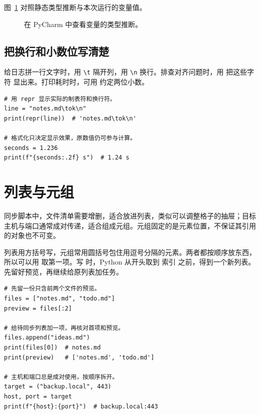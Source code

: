 图~\ref{fig:pycharm-type-inference} 对照静态类型推断与本次运行的变量值。
\begin{figure}[htbp]
  \centering
  
  \caption{在 PyCharm 中查看变量的类型推断。}
  \label{fig:pycharm-type-inference}
\end{figure}

\subsection*{把换行和小数位写清楚}

给日志拼一行文字时，用 \texttt{\textbackslash t} 隔开列，用
\texttt{\textbackslash n} 换行。排查对齐问题时，用  把这些字符
显出来。打印耗时时，可用  约定两位小数。


\begin{lstlisting}[title={\code{format_log.py}}]
# 用 repr 显示实际的制表符和换行符。
line = "notes.md\tok\n"
print(repr(line))  # 'notes.md\tok\n'

# 格式化只决定显示效果，原数值仍可参与计算。
seconds = 1.236
print(f"{seconds:.2f} s")  # 1.24 s
\end{lstlisting}


\section{列表与元组}
\label{sec:lists-and-tuples}

同步脚本中，文件清单需要增删，适合放进列表，类似可以调整格子的抽屉；目标主机与端口通常成对传递，适合组成元组。元组固定的是元素位置，不保证其引用的对象也不可变。

列表用方括号写，元组常用圆括号包住用逗号分隔的元素。两者都按顺序放东西，
所以可以用  取第一项。写  时，Python 从开头取到
索引  之前，得到一个新列表。先留好预览，再继续给原列表加任务。


\begin{lstlisting}[title={\code{sync_queue.py}}]
# 先留一份只含前两个文件的预览。
files = ["notes.md", "todo.md"]
preview = files[:2]

# 给待同步列表加一项，再核对首项和预览。
files.append("ideas.md")
print(files[0])  # notes.md
print(preview)   # ['notes.md', 'todo.md']

# 主机和端口总是成对使用，按顺序拆开。
target = ("backup.local", 443)
host, port = target
print(f"{host}:{port}")  # backup.local:443
\end{lstlisting}


